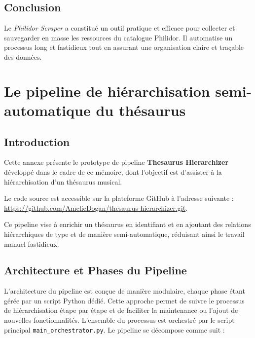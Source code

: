 \section*{Conclusion}

Le \textit{Philidor Scraper} a constitué un outil pratique et efficace pour collecter et sauvegarder en masse les ressources du catalogue Philidor.  
Il automatise un processus long et fastidieux tout en assurant une organisation claire et traçable des données.

\chapter{Le pipeline de hiérarchisation semi-automatique du thésaurus}
\label{pipeline-hierarchisation-theso}

\section*{Introduction}

Cette annexe présente le prototype de pipeline \textbf{Thesaurus Hierarchizer} développé dans le cadre de ce mémoire, dont l'objectif est d'assister à la hiérarchisation d'un thésaurus musical.

Le code source est accessible sur la plateforme GitHub à l'adresse suivante : \url{https://github.com/AmelieDogan/thesaurus-hierarchizer.git}.

Ce pipeline vise à enrichir un thésaurus en identifiant et en ajoutant des relations hiérarchiques de type  et  de manière semi-automatique, réduisant ainsi le travail manuel fastidieux.

\section*{Architecture et Phases du Pipeline}

L'architecture du pipeline est conçue de manière modulaire, chaque phase étant gérée par un script Python dédié. Cette approche permet de suivre le processus de hiérarchisation étape par étape et de faciliter la maintenance ou l'ajout de nouvelles fonctionnalités. L'ensemble du processus est orchestré par le script principal \texttt{main\_orchestrator.py}. Le pipeline se décompose comme suit :

